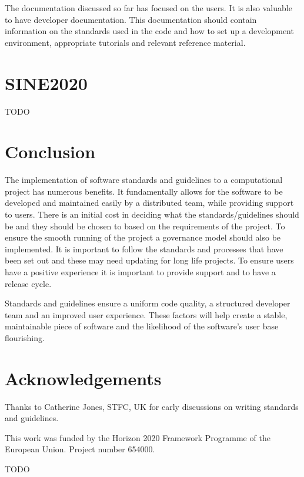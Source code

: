 \documentclass[jnr]{iosart2x}
\begin{document}
The documentation discussed so far has focused on the users.
It is also valuable to have developer documentation.
This documentation should contain information on the standards used in the code and how to set up a development environment, appropriate tutorials and relevant reference material.

\section{SINE2020}
\label{SINE2020}

TODO

\section{Conclusion}
\label{Conclusion}

The implementation of software standards and guidelines to a computational project has numerous benefits.
It fundamentally allows for the software to be developed and maintained easily by a distributed team, while providing support to users.
There is an initial cost in deciding what the standards/guidelines should be and they should be chosen to based on the requirements of the project.
To ensure the smooth running of the project a governance model should also be implemented.
It is important to follow the standards and processes that have been set out and these may need updating for long life projects.
To ensure users have a positive experience it is important to provide support and to have a release cycle.

Standards and guidelines ensure a uniform code quality, a structured developer team and an improved user experience.
These factors will help create a stable, maintainable piece of software and the likelihood of the software's user base flourishing.

\section{Acknowledgements}
\label{Acknowledgements}

Thanks to Catherine Jones, STFC, UK for early discussions on writing standards and guidelines.

This work was funded by the Horizon 2020 Framework Programme of the European Union. Project number 654000.

TODO



\nocite{*}


\end{document}
